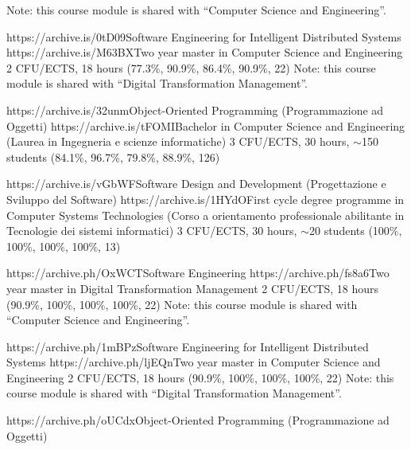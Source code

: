 \begin{outerlist}
        {
            \sedtmeit{}
            Note: this course module is shared with ``Computer Science and Engineering''.
        }
    \item[2022/23]
        \unibocourse %
        {https://archive.is/0tD09}{Software Engineering for Intelligent Distributed Systems}
        {https://archive.is/M63BX}{Two year master in Computer Science and Engineering}
        {2 CFU/ECTS, 18 hours}
        {(77.3\%, 90.9\%, 86.4\%, 90.9\%, 22)}
        {
            \sedtmeit{}
            Note: this course module is shared with ``Digital Transformation Management''.
        }
    \item[2022/23]
        \unibocourse
        {https://archive.is/32unm}{Object-Oriented Programming (Programmazione ad Oggetti)}
        {https://archive.is/tFOMI}{Bachelor in Computer Science and Engineering (Laurea in Ingegneria e scienze informatiche)}
        {3 CFU/ECTS, 30 hours, $\sim$150 students}
        {(84.1\%, 96.7\%, 79.8\%, 88.9\%, 126)}
        {\oopjava}
    \item[2022/23]
        \unibocourse
        {https://archive.is/vGbWF}{Software Design and Development (Progettazione e Sviluppo del Software)}
        {https://archive.is/1HYdO}{First cycle degree programme in Computer Systems Technologies (Corso a orientamento professionale abilitante in Tecnologie dei sistemi informatici)}
        {3 CFU/ECTS, 30 hours, $\sim$20 students}
        {(100\%, 100\%, 100\%, 100\%, 13)}
        {\oopjava}
    \item[2021/22]
        \unibocourse %
        {https://archive.ph/OxWCT}{Software Engineering}
        {https://archive.ph/fs8a6}{Two year master in Digital Transformation Management}
        {2 CFU/ECTS, 18 hours}
        {(90.9\%, 100\%, 100\%, 100\%, 22)}
        {
            \sedtmeit{}
            Note: this course module is shared with ``Computer Science and Engineering''.
        }
    \item[2021/22]
        \unibocourse %
        {https://archive.ph/1mBPz}{Software Engineering for Intelligent Distributed Systems}
        {https://archive.ph/ljEQn}{Two year master in Computer Science and Engineering}
        {2 CFU/ECTS, 18 hours}
        {(90.9\%, 100\%, 100\%, 100\%, 22)}
        {
            \sedtmeit{}
            Note: this course module is shared with ``Digital Transformation Management''.
        }
    \item[2021/22]
        \unibocourse
        {https://archive.ph/oUCdx}{Object-Oriented Programming (Programmazione ad Oggetti)}

\end{outerlist}
